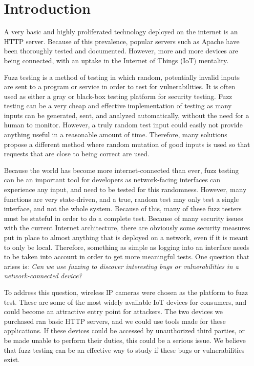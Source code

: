 \documentclass[letterpaper,twocolumn,10pt]{article}
\begin{document}
\section{Introduction}

A very basic and highly proliferated technology deployed on the internet is an HTTP server. Because of this prevalence, popular servers such as Apache have been thoroughly tested and documented. However, more and more devices are being connected, with an uptake in the Internet of Things (IoT) mentality. 

Fuzz testing is a method of testing in which random, potentially invalid inputs are sent to a program or service in order to test for vulnerabilities. It is often used as either a gray or black-box testing platform for security testing. Fuzz testing can be a very cheap and effective implementation of testing as many inputs can be generated, sent, and analyzed automatically, without the need for a human to monitor. However, a truly random test input could easily not provide anything useful in a reasonable amount of time. Therefore, many solutions propose a different method where random mutation of good inputs is used so that requests that are close to being correct are used.

Because the world has become more internet-connected than ever, fuzz testing can be an important tool for developers as network-facing interfaces can experience any input, and need to be tested for this randomness. However, many functions are very state-driven, and a true, random test may only test a single interface, and not the whole system. Because of this, many of these fuzz testers must be stateful in order to do a complete test. Because of many security issues with the current Internet architecture, there are obviously some security measures put in place to almost anything that is deployed on a network, even if it is meant to only be local. Therefore, something as simple as logging into an interface needs to be taken into account in order to get more meaningful tests. One question that arises is: \textit{Can we use fuzzing to discover interesting bugs or vulnerabilities in a network-connected device?} 

To address this question, wireless IP cameras were chosen as the platform to fuzz test. These are some of the most widely available IoT devices for consumers, and could become an attractive entry point for attackers. The two devices we purchased ran basic HTTP servers, and we could use tools made for these applications. If these devices could be accessed by unauthorized third parties, or be made unable to perform their duties, this could be a serious issue. We believe that fuzz testing can be an effective way to study if these bugs or vulnerabilities exist. 
\end{document}
